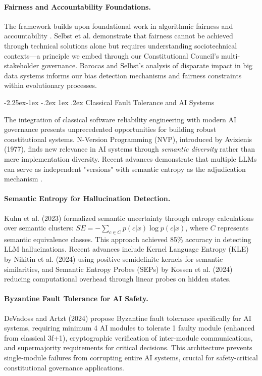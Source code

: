 \documentclass[manuscript,screen,9pt]{acmart}
\makeatletter
\renewcommand\subsection{\@startsection{subsection}{2}{\z@}%
  {-2.25ex\@plus -1ex \@minus -.2ex}%
  {1ex \@plus .2ex}%
  {\normalfont\large\bfseries}}
\makeatother
\begin{document}
\paragraph{Fairness and Accountability Foundations.} The framework builds upon foundational work in algorithmic fairness and accountability \cite{Selbst2019FairnessAccountability, Barocas2016BigDataDisparate}. Selbst et al. demonstrate that fairness cannot be achieved through technical solutions alone but requires understanding sociotechnical contexts---a principle we embed through our Constitutional Council's multi-stakeholder governance. Barocas and Selbst's analysis of disparate impact in big data systems informs our bias detection mechanisms and fairness constraints within evolutionary processes.

\subsection{Classical Fault Tolerance and AI Systems}
\label{subsec:classical_fault_tolerance}

The integration of classical software reliability engineering with modern AI governance presents unprecedented opportunities for building robust constitutional systems. N-Version Programming (NVP), introduced by Avizienis (1977), finds new relevance in AI systems through \textit{semantic diversity} rather than mere implementation diversity. Recent advances demonstrate that multiple LLMs can serve as independent "versions" with semantic entropy as the adjudication mechanism \cite{Kuhn2023SemanticEntropy}.

\paragraph{Semantic Entropy for Hallucination Detection.} Kuhn et al. (2023) formalized semantic uncertainty through entropy calculations over semantic clusters: $SE = -\sum_{c \in C} p(c|x) \log p(c|x)$, where $C$ represents semantic equivalence classes. This approach achieved 85\% accuracy in detecting LLM hallucinations. Recent advances include Kernel Language Entropy (KLE) by Nikitin et al. (2024) using positive semidefinite kernels for semantic similarities, and Semantic Entropy Probes (SEPs) by Kossen et al. (2024) reducing computational overhead through linear probes on hidden states.

\paragraph{Byzantine Fault Tolerance for AI Safety.} DeVadoss and Artzt (2024) propose Byzantine fault tolerance specifically for AI systems, requiring minimum 4 AI modules to tolerate 1 faulty module (enhanced from classical 3f+1), cryptographic verification of inter-module communications, and supermajority requirements for critical decisions. This architecture prevents single-module failures from corrupting entire AI systems, crucial for safety-critical constitutional governance applications.
\end{document}
